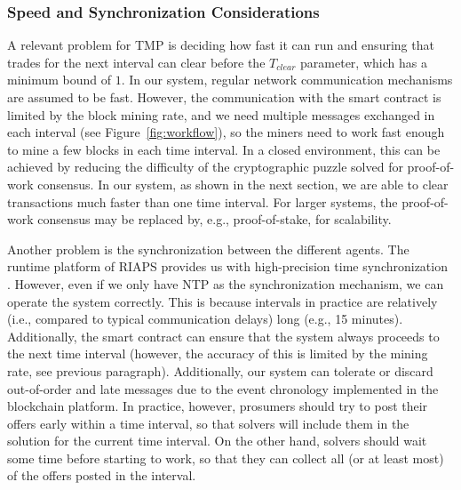 \subsubsection{Speed and Synchronization Considerations}
A relevant problem for TMP is deciding how fast it can run and ensuring that trades for the next interval can clear before the $T_{clear}$ parameter, which has a minimum bound of $1$.
In our system, regular network communication mechanisms are assumed to be fast. However, the communication with the smart contract is limited by the block mining rate, and we need multiple messages exchanged in each interval (see Figure~\ref{fig:workflow}), so the miners need to work fast enough to mine a few blocks in each time interval. In a closed environment, this can be achieved by reducing the difficulty of the cryptographic puzzle solved for proof-of-work consensus. In our system, as shown in the next section, we are able to clear transactions much faster than one time interval. 
For larger systems, the proof-of-work consensus may be replaced by, e.g., proof-of-stake, for scalability.

Another problem is the synchronization between the different agents. The runtime platform of RIAPS provides us with high-precision time synchronization \cite{riaps2}. However, even if we only have NTP as the synchronization mechanism, we can operate the system correctly. This is because intervals in practice are relatively (i.e.,  compared to typical communication delays) long (e.g., 15 minutes). Additionally, the smart contract can ensure that the system always proceeds to the next time interval (however, the accuracy of this is limited by the mining rate, see previous paragraph). Additionally, our system can  tolerate or discard out-of-order and late messages due to the event chronology implemented in the blockchain platform. In practice, however, prosumers should try to post their offers early within a time interval, so that solvers will include them in the solution for the current time interval. On the other hand, solvers should wait some time before starting to work, so that they can collect all (or at least most) of the offers posted in the interval.


